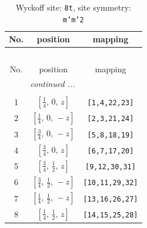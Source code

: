 \documentclass[fleqn,8pt]{jsarticle}
\begin{document}
\begin{longtable}{ccc}
\caption{Wyckoff site: {\tt 8t}, site symmetry: {\tt m'm'2}}
 \\
 \hline \hline
No. & position & mapping \\ \hline \endfirsthead

\multicolumn{2}{l}{\tablename\ \thetable{}} \\
 \hline \hline
No. & position & mapping \\ \hline \endhead

 \hline \hline
\multicolumn{2}{r}{\footnotesize\it continued ...} \\ \endfoot

 \hline \hline
\multicolumn{2}{r}{} \\ \endlastfoot

1 & $\left[ \frac{1}{4},\, 0,\, z \right]$ & {\tt [1,4,22,23]} \\ \hline
2 & $\left[ \frac{1}{4},\, 0,\, - z \right]$ & {\tt [2,3,21,24]} \\ \hline
3 & $\left[ \frac{3}{4},\, 0,\, - z \right]$ & {\tt [5,8,18,19]} \\ \hline
4 & $\left[ \frac{3}{4},\, 0,\, z \right]$ & {\tt [6,7,17,20]} \\ \hline
5 & $\left[ \frac{3}{4},\, \frac{1}{2},\, z \right]$ & {\tt [9,12,30,31]} \\ \hline
6 & $\left[ \frac{3}{4},\, \frac{1}{2},\, - z \right]$ & {\tt [10,11,29,32]} \\ \hline
7 & $\left[ \frac{1}{4},\, \frac{1}{2},\, - z \right]$ & {\tt [13,16,26,27]} \\ \hline
8 & $\left[ \frac{1}{4},\, \frac{1}{2},\, z \right]$ & {\tt [14,15,25,28]} \\
\end{longtable}
\renewcommand{\arraystretch}{1.2}
\end{document}
